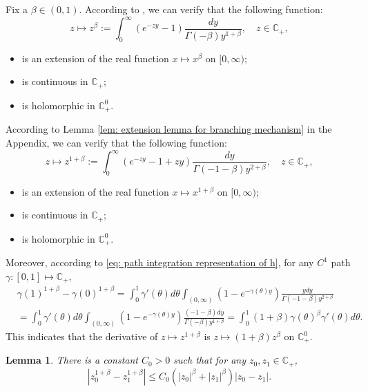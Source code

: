 \documentclass[12pt, a4paper]{amsart}
\newtheorem{lem}[thm]{Lemma}
\theoremstyle{definition}
\numberwithin{equation}{section}
\begin{document}
    Fix a $\beta \in (0,1)$.
    According to \cite[Theorem 3.2. \& Theorem 3.5.]{SchillingSongVondracek2010Bernstein}, we can verify that the following function:
\begin{equation}
    z
    \mapsto z^{\beta}
    := \int_0^\infty (e^{-zy}-1) \frac{dy}{\Gamma(-\beta)y^{1+\beta}},
    \quad z\in \mathbb C_+,
\end{equation}
\begin{itemize}
\item
    is an extension of the real function $x\mapsto x^{\beta}$ on $[0,\infty)$;
\item
    is continuous in $\mathbb C_+$;
\item
    is holomorphic in $\mathbb C_+^0$.
\end{itemize}
    According to Lemma \ref{lem: extension lemma for branching mechanism} in the Appendix, we can verify that the following function:
\begin{equation}
\label{eq: stable branching on C+}
    z\mapsto
    z^{1+\beta}
    := \int_0^\infty (e^{-zy}-1+zy)\frac{dy}{\Gamma(-1-\beta)y^{2+\beta}},
    \quad z\in \mathbb C_+,
\end{equation}
\begin{itemize}
\item
    is an extension of the real function $x\mapsto x^{1+\beta}$ on $[0,\infty)$;
\item
    is continuous in $\mathbb C_+$;
\item
    is holomorphic in $\mathbb C_+^0$.
\end{itemize}
    Moreover, according to \eqref{eq: path integration representation of h}, for any $C^1$ path $\gamma:[0,1]\mapsto \mathbb C_+$,
\begin{align}
\label{eq: integration formula for 1+beta-th power of z}
    &\gamma(1)^{1+\beta} - \gamma(0)^{1+\beta}
    = \int_0^1 \gamma'(\theta)d\theta \int_{(0,\infty)}(1-e^{-\gamma(\theta)y})\frac{ydy}{\Gamma(-1-\beta)y^{2+\beta}}
    \\&=\int_0^1 \gamma'(\theta)d\theta \int_{(0,\infty)}(1-e^{-\gamma(\theta)y})\frac{(-1-\beta)dy}{\Gamma(-\beta)y^{1+\beta}}
    = \int_0^1 (1+\beta) \gamma(\theta)^{\beta} \gamma'(\theta)d\theta.
\end{align}
    This indicates that the derivative of $z\mapsto z^{1+\beta}$ is $z\mapsto (1+\beta)z^{\beta}$ on $\mathbb C^0_+$.
\begin{lem}
\label{lem: Lip of power function}
    There is a constant $C_0 > 0$ such that for any $z_0,z_1 \in \mathbb C_+$,
\[
    |z_0^{1+\beta} - z_1^{1+\beta}|
    \leq C_0(|z_0|^{\beta}+|z_1|^{\beta})|z_0 - z_1|.
\]
\end{lem}
\end{document}
